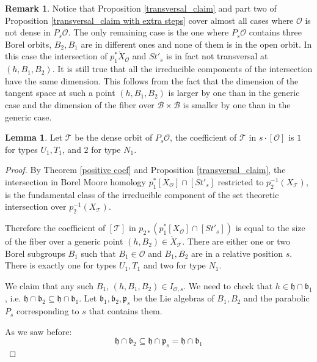 \documentclass[12pt]{article}
\newcommand{\B}{\mathcal{B}}
\newcommand{\s}{\mathcal{O}}
\theoremstyle{plain}
\theoremstyle{definition}
\newtheorem{lemma}[theorem]{Lemma}
\newtheorem{Remark}[theorem]{Remark}
\begin{document}
\begin{Remark}\label{remark: non_transversal}
    Notice that Proposition \ref{transversal_claim} and part two of Proposition \ref{transversal_claim with extra steps} cover almost all cases where $\s$ is not dense in $P_s\s$. The only remaining case is the one where $P_s\s$ contains three Borel orbits, $B_2,B_1$ are in different ones and none of them is in the open orbit. In this case the intersection of $p_{1}^*\mathring{X}_{\mathcal{O}}$ and $St'_{s}$ is in fact not transversal at $(h,B_1,B_2)$. It is still true that all the irreducible components of the intersection have the same dimension. This follows from the fact that the dimension of the tangent space at such a point $(h,B_1,B_2)$ is larger by one than in the generic case and the dimension of the fiber over $\B\times \B$ is smaller by one than in the generic case.
\end{Remark}


\begin{lemma}\label{coef open}
    Let $\mathcal{T}$ be the dense orbit of $P_{s}\mathcal{O}$, the coefficient of $\mathcal{T}$ in $s\cdot[\mathcal{O}]$ is $1$ for types $U_{1}, T_{1}$, and $2$ for type $N_{1}$.
\end{lemma}
\begin{proof}
    By Theorem \ref{positive coef} and Proposition \ref{transversal_claim}, the intersection in Borel Moore homology $p_1^*[{X}_\s]\cap [St'_s]$ restricted to $p_2^{-1}(X_\mathcal{T})$, is the fundamental class of the irreducible component of the set theoretic intersection over $p_2^{-1}(X_\mathcal{T})$.
    
    Therefore the coefficient of $[\mathcal{T}]$ in $p_{2*}(p_1^*[{X}_\s]\cap [St'_s])$ is equal to the size of the fiber over a generic point $(h,B_{2})\in \mathring{X}_{\mathcal{T}}$. There are either one or two Borel subgroups $B_{1}$ such that $B_{1}\in \mathcal{O}$ and $B_{1},B_{2}$ are in a relative position $s$. There is exactly one for types $U_{1},T_{1}$ and two for type $N_{1}$.

    We claim that any such $B_{1}$, $(h,B_{1},B_{2})\in I_{\s,s}$. We need to check that $h\in \mathfrak{h}\cap \mathfrak{b}_{1}$, i.e. $\mathfrak{h}\cap \mathfrak{b}_{2}\subseteq \mathfrak{h} \cap \mathfrak{b}_{1}$.
    Let $\mathfrak{b_1},\mathfrak{b_2},\mathfrak{p}_s$ be the Lie algebras of $B_1,B_2$ and the parabolic $P_s$ corresponding to $s$ that contains them.
    
    As we saw before:
    $$\mathfrak{h}\cap \mathfrak{b}_{2}\subseteq \mathfrak{h} \cap \mathfrak{p}_{s}=\mathfrak{h} \cap \mathfrak{b}_{1}$$
\end{proof}
\end{document}
